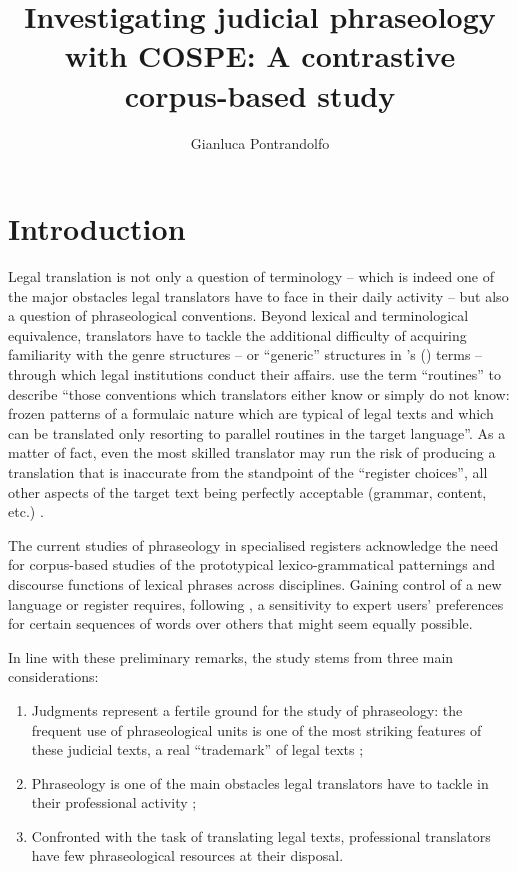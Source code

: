 \documentclass[output=paper]{LSP/langsci}
\author{Gianluca Pontrandolfo}
\title{Investigating judicial phraseology with COSPE: A contrastive corpus-based study}
\begin{document}
\section{Introduction}
 Legal translation is not only a question of terminology – which is indeed one of the major obstacles legal translators have to face in their daily activity – but also a question of phraseological conventions. Beyond lexical and terminological equivalence, translators have to tackle the additional difficulty of acquiring familiarity with the genre structures – or “generic” structures in \citeauthor{Hasan1978}'s (\citeyear{Hasan1978}) terms – through which legal institutions conduct their affairs. \citet[190]{Hatim1990} use the term “routines” to describe “those conventions which translators either know or simply do not know: frozen patterns of a formulaic nature which are typical of legal texts and which can be translated only resorting to parallel routines in the target language”. As a matter of fact, even the most skilled translator may run the risk of producing a translation that is inaccurate from the standpoint of the “register choices”, all other aspects of the target text being perfectly acceptable (grammar, content, etc.) \citep[see][218--219]{Garzone2007}.
 
The current studies of phraseology in specialised registers acknowledge the need for corpus-based studies of the prototypical lexico-grammatical patternings and discourse functions of lexical phrases across disciplines. Gaining control of a new language or register requires, following \citet[5]{Hyland2008}, a sensitivity to expert users’ preferences for certain sequences of words over others that might seem equally possible.
 
In line with these preliminary remarks, the study stems from three main considerations:

\begin{enumerate}
\item Judgments represent a fertile ground for the study of phraseology: the frequent use of phraseological units is one of the most striking features of these judicial texts, a real “trademark” of legal texts \citep[154]{Mortara2001};
\item Phraseology is one of the main obstacles legal translators have to tackle in their professional activity \citep[see][]{Garzone2007,Kjaer2007};
\item Confronted with the task of translating legal texts, professional translators have few phraseological resources at their disposal.
\end{enumerate}
\end{document}
